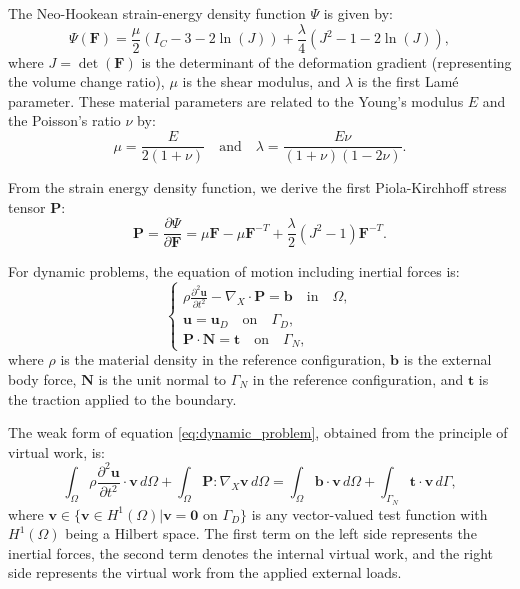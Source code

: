 The Neo-Hookean strain-energy density function $\Psi$ is given by:
\begin{equation}
    \Psi(\bm{F}) = \frac{\mu}{2} (I_C - 3 - 2\ln(J)) + \frac{\lambda}{4} (J^2 - 1 - 2\ln(J)),
\label{eq:neo_hookean_energy}
\end{equation}
where $J = \det(\bm{F})$ is the determinant of the deformation gradient (representing the volume change ratio), $\mu$ is the shear modulus, and $\lambda$ is the first Lamé parameter. These material parameters are related to the Young's modulus $E$ and the Poisson's ratio $\nu$ by:
\begin{equation}
    \mu = \frac{E}{2(1+\nu)} \quad \text{and} \quad \lambda = \frac{E\nu}{(1+\nu)(1-2\nu)}.
\end{equation}

From the strain energy density function, we derive the first Piola-Kirchhoff stress tensor $\bm{P}$:
\begin{equation}
    \bm{P} = \frac{\partial \Psi}{\partial \bm{F}} = \mu \bm{F} - \mu \bm{F}^{-T} + \frac{\lambda}{2}(J^2-1)\bm{F}^{-T}.
\label{eq:piola_stress}
\end{equation}

For dynamic problems, the equation of motion including inertial forces is:
\begin{equation}
    \begin{cases}
        \rho \frac{\partial^2 \bm{u}}{\partial t^2} - \nabla_X \cdot \bm{P} = \bm{b} \quad \text{in} \quad \Omega, \\
        \bm{u} = \bm{u}_D \quad \text{on} \quad \Gamma_D, \\
        \bm{P} \cdot \bm{N} = \bm{t} \quad \text{on} \quad \Gamma_N,
    \end{cases}
\label{eq:dynamic_problem}
\end{equation}
where $\rho$ is the material density in the reference configuration, $\bm{b}$ is the external body force, $\bm{N}$ is the unit normal to $\Gamma_N$ in the reference configuration, and $\bm{t}$ is the traction applied to the boundary.

The weak form of equation \eqref{eq:dynamic_problem}, obtained from the principle of virtual work, is:
\begin{equation}
    \int_{\Omega} \rho \frac{\partial^2 \bm{u}}{\partial t^2} \cdot \bm{v} \, d\Omega + \int_{\Omega} \bm{P} : \nabla_X \bm{v} \, d\Omega = \int_{\Omega} \bm{b} \cdot \bm{v} \, d\Omega + \int_{\Gamma_N} \bm{t} \cdot \bm{v} \, d\Gamma,
\label{eq:weak_form}
\end{equation}
where $\bm{v} \in \{\bm{v} \in H^1(\Omega) | \bm{v} = \bm{0} \text{ on } \Gamma_D\}$ is any vector-valued test function with $H^1(\Omega)$ being a Hilbert space. The first term on the left side represents the inertial forces, the second term denotes the internal virtual work, and the right side represents the virtual work from the applied external loads.


